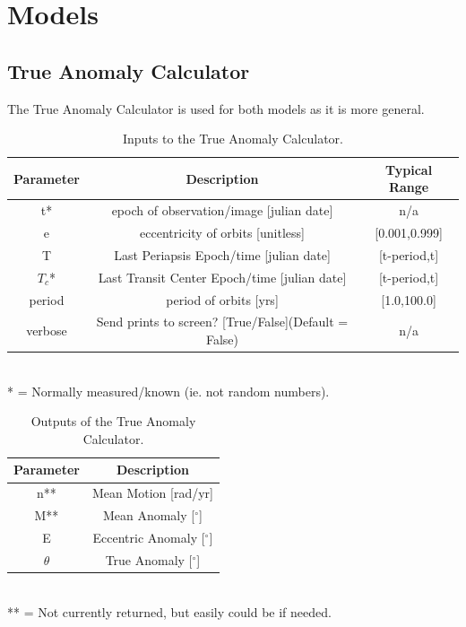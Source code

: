 \documentclass[12pt,preprint]{aastex}
\begin{document}
\section{Models}

\subsection{True Anomaly Calculator}\label{sec:TAcalc}
The True Anomaly Calculator is used for both models as it is more general.

\begin{table}[h]
\centering
\caption{ Inputs to the True Anomaly Calculator.}
\begin{tabular}{c c c}
\hline\hline
Parameter & Description & Typical Range \\
\hline
t* & epoch of observation/image [julian date] & n/a\\
e & eccentricity of orbits [unitless] & [0.001,0.999]\\
T & Last Periapsis Epoch/time [julian date] & [t-period,t]\\
$T_c$* & Last Transit Center Epoch/time [julian date] & [t-period,t]\\
period & period of orbits [yrs] & [1.0,100.0]\\
verbose & Send prints to screen? [True/False](Default = False) & n/a\\
\hline
\end{tabular}
\\
 * = Normally measured/known (ie. not random numbers).
\end{table}


\begin{table}[h]
\centering
\caption{ Outputs of the True Anomaly Calculator.}
\begin{tabular}{c c}
\hline\hline
Parameter & Description \\
\hline
n** & Mean Motion [rad/yr] \\
M** & Mean Anomaly [$^{\circ}$]\\
E & Eccentric Anomaly [$^{\circ}$]\\
$\theta$ & True Anomaly [$^{\circ}$]\\
\hline
\end{tabular}
\\
 ** = Not currently returned, but easily could be if needed.
\end{table}
\pagebreak
\end{document}
